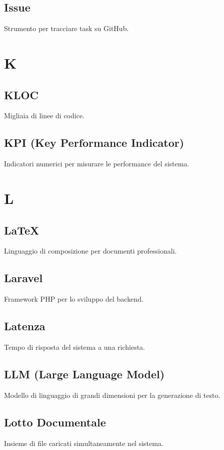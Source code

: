 \documentclass[a4paper,12pt]{article}
\begin{document}
\subsection{Issue}
Strumento per tracciare task su GitHub.

\section{K}
\subsection{KLOC}
Migliaia di linee di codice.

\subsection{KPI (Key Performance Indicator)}
Indicatori numerici per misurare le performance del sistema.

\section{L}

\subsection{LaTeX}
Linguaggio di composizione per documenti professionali.

\subsection{Laravel}
Framework PHP per lo sviluppo del backend.

\subsection{Latenza}
Tempo di risposta del sistema a una richiesta.


\subsection{LLM (Large Language Model)}
Modello di linguaggio di grandi dimensioni per la generazione di testo.

\subsection{Lotto Documentale}
Insieme di file caricati simultaneamente nel sistema.
\end{document}
